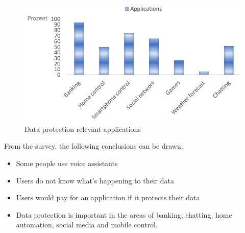 \begin{figure}[h]
	\centering
	\includegraphics[width=0.9\linewidth]{Picture/umfrage_anwendung}
	\caption[Data protection relevant applications]{Data protection relevant applications}
	\label{survey_application}
\end{figure}

From the survey, the following conclusions can be drawn:
\begin{itemize}	
	\item Some people use voice assistants
	\item Users do not know what's happening to their data
	\item Users would pay for an application if it protects their data
	\item Data protection is important in the areas of banking, chatting, home automation, social media and mobile control.
\end{itemize}
